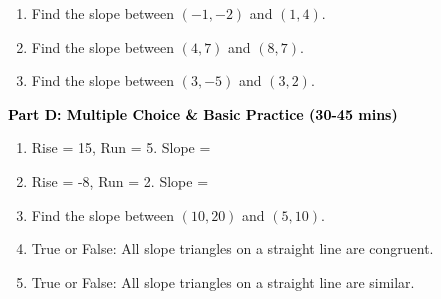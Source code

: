 \documentclass[12pt, letterpaper, fleqn]{article}
\newcommand{\blank}{\underline{\hspace{2.2cm}}}
\begin{document}
\begin{enumerate}[itemsep=2.5cm, leftmargin=0.6cm, resume]
\item Find the slope between $(-1, -2)$ and $(1, 4)$. \blank
\item Find the slope between $(4, 7)$ and $(8, 7)$. \blank
\item Find the slope between $(3, -5)$ and $(3, 2)$. \blank
\end{enumerate}

\newpage

\begin{tcolorbox}[colback=customteal!20]
\large\textcolor{black}{\textbf{Part D: Multiple Choice \& Basic Practice (30-45 mins)}}
\end{tcolorbox}

\vspace{3mm}

\begin{enumerate}[itemsep=2.5cm, leftmargin=0.6cm, resume]
\item Rise = 15, Run = 5. Slope = \blank
\item Rise = -8, Run = 2. Slope = \blank
\item Find the slope between $(10, 20)$ and $(5, 10)$. \blank
\item True or False: All slope triangles on a straight line are congruent. \blank
\item True or False: All slope triangles on a straight line are similar. \blank
\end{enumerate}
\end{document}
